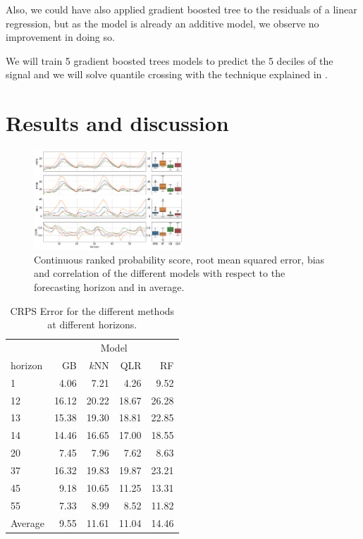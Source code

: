 \documentclass[a4paper,twocolumn,5p]{elsarticle}
\begin{document}
Also, we could have also applied gradient boosted tree to the
residuals of a linear regression, but as the model is already an
additive model, we observe no improvement in doing so.

We will train 5 gradient boosted trees models to predict the 5 deciles
of the signal and we will solve quantile crossing with the technique
explained in \cite{cross}.


\section{Results and discussion}
\label{sec:results}

\begin{figure}[tbp]
  \centering
  \includegraphics[width=0.5\textwidth]{results/errorGraph}
  \caption{\label{figure:errorGraph}
    Continuous ranked probability score, root mean squared
    error, bias and correlation of the different models with respect to the
    forecasting horizon and in average.%
  }
\end{figure}

\begin{table}[tbp]
  \centering
  \caption{\label{tab:determ}CRPS Error for the different methods at different
    horizons.%
  }
  \begin{tabular}{lrrrr}
    \toprule
    & \multicolumn{4}{c}{Model} \\ \cmidrule{2-5} 
    horizon &    GB &   $k$NN &   QLR &    RF \\
    \midrule
    1     & 4.06 &  7.21 &  4.26 &  9.52 \\
    12    & 16.12 & 20.22 & 18.67 & 26.28 \\
    13    & 15.38 & 19.30 & 18.81 & 22.85 \\
    14    & 14.46 & 16.65 & 17.00 & 18.55 \\
    20    & 7.45 &  7.96 &  7.62 &  8.63 \\
    37    & 16.32 & 19.83 & 19.87 & 23.21 \\
    45    & 9.18 & 10.65 & 11.25 & 13.31 \\
    55    & 7.33 &  8.99 &  8.52 & 11.82 \\
    \midrule
    Average & 9.55 & 11.61 & 11.04 & 14.46 \\
    \bottomrule
  \end{tabular}
\end{table}
\end{document}
